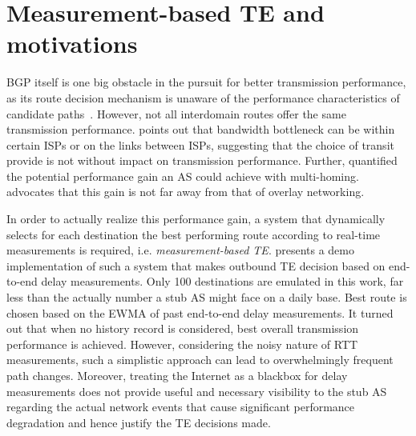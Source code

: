 \section{Measurement-based TE and motivations}

BGP itself is one big obstacle in the pursuit for better transmission performance, as its route decision mechanism is unaware of the performance characteristics of candidate paths~\cite{Yannuzzi2005}.
However, not all interdomain routes offer the same transmission performance. \cite{Akella2003} points out that bandwidth bottleneck can be within certain \acp{ISP} or on the links between \acp{ISP}, suggesting that the choice of transit provide is not without impact on transmission performance.
Further, \cite{Akella2003a} quantified the potential performance gain an AS could achieve with multi-homing.
\cite{Akella2004} advocates that this gain is not far away from that of overlay networking.

In order to actually realize this performance gain, a system that dynamically selects for each destination the best performing route according to real-time measurements is required, i.e. \textit{measurement-based TE}.
\cite{Akella2008} presents a demo implementation of such a system that makes outbound TE decision based on end-to-end delay measurements. Only 100 destinations are emulated in this work, far less than the actually number a stub AS might face on a daily base. Best route is chosen based on the \acf{EWMA} of past end-to-end delay measurements. It turned out that when no history record is considered, best overall transmission performance is achieved. However, considering the noisy nature of RTT measurements, such a simplistic approach can lead to overwhelmingly frequent path changes. Moreover, treating the Internet as a blackbox for delay measurements does not provide useful and necessary visibility to the stub AS regarding the actual network events that cause significant performance degradation and hence justify the TE decisions made. 

